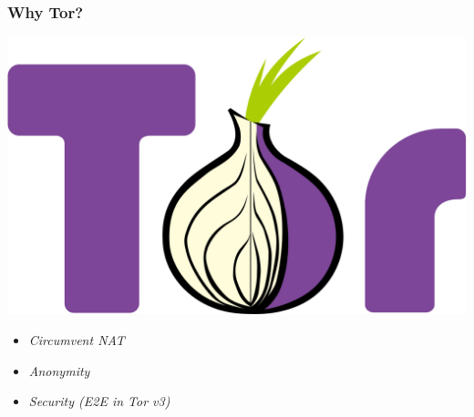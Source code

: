 \documentclass{beamer}
\begin{document}
\begin{frame}
	\frametitle{Why Tor?}
    \begin{center}
	\includegraphics[scale=0.05]{resources/tor.png}
    \end{center}
	\begin{itemize}
		\item \textit{Circumvent NAT}
		\item \textit{Anonymity}
		\item \textit{Security (E2E in Tor v3)}
	\end{itemize}
\end{frame}
\end{document}
